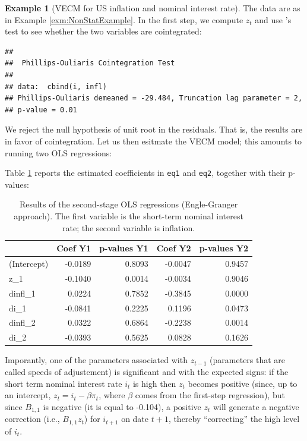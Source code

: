 \documentclass[
  11pt,
]{book}
\theoremstyle{definition}
\theoremstyle{definition}
\newtheorem{example}{Example}[chapter]
\theoremstyle{definition}
\theoremstyle{definition}
\theoremstyle{remark}
\begin{document}
\begin{example}[VECM for US inflation and nominal interest rate]
\protect\hypertarget{exm:VECMUS}{}\label{exm:VECMUS}The data are as in Example \ref{exm:NonStatExample}. In the first step, we compute \(z_t\) and use \citet{Phillips_Ouliaris_1990}'s test to see whether the two variables are cointegrated:

\begin{verbatim}
## 
##  Phillips-Ouliaris Cointegration Test
## 
## data:  cbind(i, infl)
## Phillips-Ouliaris demeaned = -29.484, Truncation lag parameter = 2,
## p-value = 0.01
\end{verbatim}

We reject the null hypothesis of unit root in the residuals. That is, the results are in favor of cointegration. Let us then esitmate the VECM model; this amounts to running two OLS regressions:

Table \ref{tab:EngleGrangerUS3} reports the estimated coefficients in \texttt{eq1} and \texttt{eq2}, together with their p-values:

\begin{table}

\caption{\label{tab:EngleGrangerUS3}Results of the second-stage OLS regressions (Engle-Granger approach). The first variable is the short-term nominal interest rate; the second variable is inflation.}
\centering
\begin{tabular}[t]{l|r|r|r|r}
\hline
  & Coef Y1 & p-values Y1 & Coef Y2 & p-values Y2\\
\hline
(Intercept) & -0.0189 & 0.8093 & -0.0047 & 0.9457\\
\hline
z\_1 & -0.1040 & 0.0014 & -0.0034 & 0.9046\\
\hline
dinfl\_1 & 0.0224 & 0.7852 & -0.3845 & 0.0000\\
\hline
di\_1 & -0.0841 & 0.2225 & 0.1196 & 0.0473\\
\hline
dinfl\_2 & 0.0322 & 0.6864 & -0.2238 & 0.0014\\
\hline
di\_2 & -0.0393 & 0.5625 & 0.0828 & 0.1626\\
\hline
\end{tabular}
\end{table}

Imporantly, one of the parameters associated with \(z_{t-1}\) (parameters that are called speeds of adjustement) is significant and with the expected signs: if the short term nominal interest rate \(i_t\) is high then \(z_t\) becomes positive (since, up to an intercept, \(z_t = i_t - \beta \pi_t\), where \(\beta\) comes from the first-step regression), but since \(B_{1,1}\) is negative (it is equal to -0.104), a positive \(z_t\) will generate a negative correction (i.e., \(B_{1,1}z_t\)) for \(i_{t+1}\) on date \(t+1\), thereby ``correcting'' the high level of \(i_t\).
\end{example}
\end{document}
